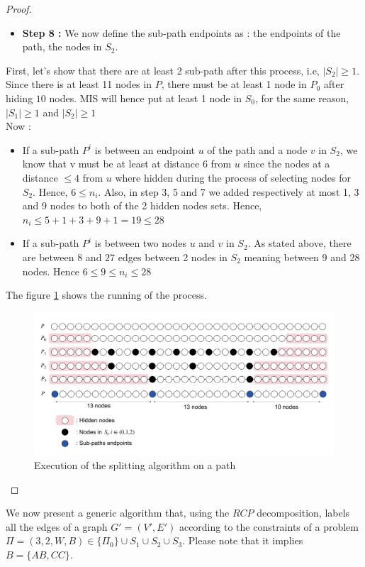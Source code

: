 \begin{claim}
\begin{proof}
\begin{itemize}
\item\textbf{Step 8 :} We now define the sub-path endpoints as : the endpoints of the path, the nodes in $S_2$.\\
\end{itemize}
First, let's show that there are at least 2 sub-path after this process, i.e, $|S_2|\geq 1$. Since there is at least 11 nodes in $P$, there must be at least 1 node in $P_0$ after hiding $10$ nodes. MIS will hence put at least 1 node in $S_0$, for the same reason, $|S_1|\geq 1$ and $|S_2|\geq 1$\\
Now :
\begin{itemize}
    \item If a sub-path $P^i$ is between an endpoint $u$ of the path and a node $v$ in $S_2$, we know that v must be at least at distance $6$ from $u$ since the nodes at a distance $\leq 4$ from $u$ where hidden during the process of selecting nodes for $S_2$. Hence, $6\leq n_i$. Also, in step 3, 5 and 7 we added respectively at most 1, 3 and 9 nodes to both of the 2 hidden nodes sets. Hence, $n_i \leq 5+1+3+9+1 = 19 \leq 28$
    \item If a sub-path $P^i$  is between two nodes $u$ and $v$ in $S_2$. As stated above, there are between $8$ and $27$ edges between 2 nodes in $S_2$ meaning between 9 and 28 nodes. Hence $6 \leq 9 \leq n_i \leq 28$

\end{itemize}
The figure \ref{fig:path} shows the running of the process.
\begin{figure}[htb]
    \centering
    \includegraphics[scale = 0.20]{Figures/path.pdf}
    \caption{Execution of the splitting algorithm on a path}
    \label{fig:path}
\end{figure}
\end{proof}
\end{claim}
We now present a generic algorithm that, using the $RCP$ decomposition, labels all the edges of a graph $G'=(V',E')$ according to the constraints of a problem $\Pi=(3,2,W,B) \in \{\Pi_0\}\cup S_1\cup S_2\cup S_3$. Please note that it implies $B=\{AB,CC\}$.

